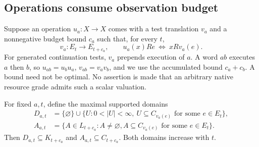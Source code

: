 \documentclass[11pt]{article}
\theoremstyle{definition}\newtheorem{definition}[theorem]{Definition}
\theoremstyle{remark}\newtheorem{remark}[theorem]{Remark}
\begin{document}
\subsection{Operations consume observation budget}
Suppose an operation $u_a:X\to X$ comes with a test translation $v_a$ and
a nonnegative budget bound $c_a$ such that, for every $t$,
\[
 v_a:E_t\longrightarrow E_{t+c_a},\qquad
 u_a(x)Re\ \Longleftrightarrow\ xRv_a(e).                       
\]
For generated continuation tests, $v_a$ prepends execution of $a$.
A word $ab$ executes $a$ then $b$, so $u_{ab}=u_bu_a$,
$v_{ab}=v_av_b$, and we use the accumulated bound $c_a+c_b$.
A bound need not be optimal. No assertion is made that an arbitrary
native resource grade admits such a scalar valuation.

For fixed $a,t$, define the maximal supported domains
\begin{align*}
 D_{a,t}&=\{\varnothing\}\cup
 \{U:0<|U|<\infty,\ U\subseteq C_{v_a(e)}\text{ for some }e\in E_t\},\\
 A_{a,t}&=\{A\in L_{t+c_a}:A\ne\varnothing,
                  A\subseteq C_{v_a(e)}\text{ for some }e\in E_t\}.
\end{align*}
Then $D_{a,t}\subseteq K_{t+c_a}$ and $A_{a,t}\subseteq C_{t+c_a}$.
Both domains increase with $t$.
\end{document}
